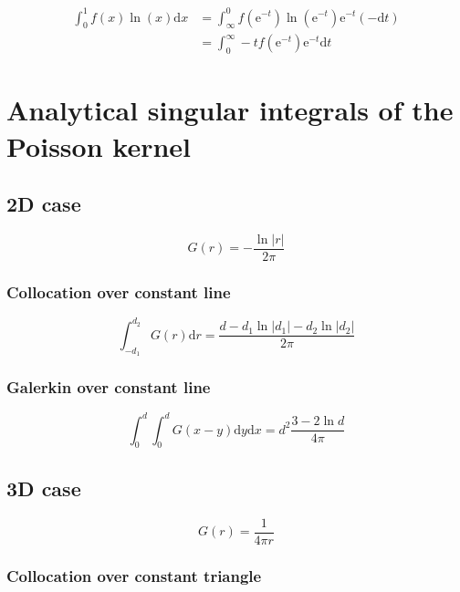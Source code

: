 \documentclass[a4paper,10pt,twocolumn]{article}
\newcommand{\td}{\mathrm{d}}
\newcommand{\te}{\mathrm{e}}
\begin{document}
\begin{align}
\int_0^1 f(x) \ln(x) \td x
& = \int_{\infty}^0 f(\te^{-t}) \ln(\te^{-t}) \te^{-t} (-\td t) \nonumber \\
& = \int_{0}^{\infty} -t f(\te^{-t}) \te^{-t} \td t
\end{align}


\section{Analytical singular integrals of the Poisson kernel}

\subsection{2D case}

\begin{equation}
G(r) = -\frac{\ln |r|}{2\pi}
\end{equation}

\subsubsection{Collocation over constant line}

\begin{equation}
\int_{-d_1}^{d_2} G(r) \td r
=
\frac{d - d_1 \ln |d_1| - d_2 \ln |d_2|}{2\pi}
\end{equation}


\subsubsection{Galerkin over constant line}

\begin{equation}
\int_{0}^{d} \int_{0}^{d} G(x-y) \td y \td x
=
d^2\frac{3-2\ln d}{4\pi}
\end{equation}


\subsection{3D case}

\begin{equation}
G(r) = \frac{1}{4\pi r}
\end{equation}

\subsubsection{Collocation over constant triangle}
\end{document}

